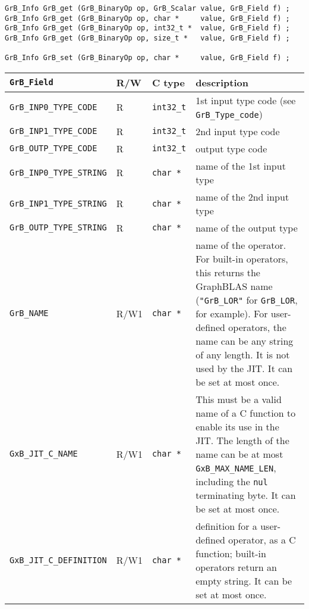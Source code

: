 \begin{mdframed}[userdefinedwidth=6in]
{\footnotesize
\begin{verbatim}
GrB_Info GrB_get (GrB_BinaryOp op, GrB_Scalar value, GrB_Field f) ;
GrB_Info GrB_get (GrB_BinaryOp op, char *     value, GrB_Field f) ;
GrB_Info GrB_get (GrB_BinaryOp op, int32_t *  value, GrB_Field f) ;
GrB_Info GrB_get (GrB_BinaryOp op, size_t *   value, GrB_Field f) ;

GrB_Info GrB_set (GrB_BinaryOp op, char *     value, GrB_Field f) ;
\end{verbatim}
}\end{mdframed}

\noindent
{\small
\begin{tabular}{|l|l|l|p{2.8in}|}
\hline
\verb'GrB_Field'                    & R/W  & C type        & description \\
\hline
\verb'GrB_INP0_TYPE_CODE'          & R    & \verb'int32_t'& 1st input type code (see \verb'GrB_Type_code') \\
\verb'GrB_INP1_TYPE_CODE'          & R    & \verb'int32_t'& 2nd input type code \\
\verb'GrB_OUTP_TYPE_CODE'          & R    & \verb'int32_t'& output type code \\
\verb'GrB_INP0_TYPE_STRING'        & R    & \verb'char *' & name of the 1st input type \\
\verb'GrB_INP1_TYPE_STRING'        & R    & \verb'char *' & name of the 2nd input type \\
\verb'GrB_OUTP_TYPE_STRING'        & R    & \verb'char *' & name of the output type \\
\hline
\verb'GrB_NAME'                     & R/W1 & \verb'char *' &    %
    name of the operator.  For built-in operators, this returns the GraphBLAS
    name (\verb'"GrB_LOR"' for \verb'GrB_LOR', for example).
    For user-defined operators, the name can be any string of any length.  It
    is not used by the JIT.  It can be set at most once. \\
\verb'GxB_JIT_C_NAME'               & R/W1 & \verb'char *' &
    This must be a valid name of a C function to enable its use in the JIT.
    The length of the name can be at most \verb'GxB_MAX_NAME_LEN', including
    the \verb'nul' terminating byte.  It can be set at most once. \\
\verb'GxB_JIT_C_DEFINITION'         & R/W1 & \verb'char *' &
    definition for a user-defined operator, as a C function; built-in operators
    return an empty string.  It can be set at most once. \\
\hline
\end{tabular}
}

